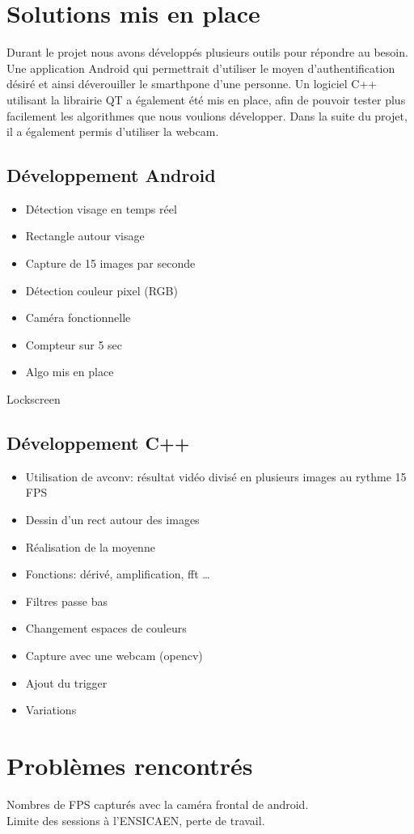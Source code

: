 \section{Solutions mis en place}

Durant le projet nous avons développés plusieurs outils pour répondre au besoin. Une application Android qui permettrait d'utiliser le moyen d'authentification désiré et ainsi déverouiller le smarthpone d'une
personne. Un logiciel C++ utilisant la librairie QT a également été mis en place, afin de pouvoir tester plus facilement les algorithmes que nous voulions développer. Dans la suite du projet, il a également
permis d'utiliser la webcam. 

\subsection{Développement Android}

\begin{itemize}
	\item Détection visage en temps réel
	\item Rectangle autour visage
	\item Capture de 15 images par seconde
	\item Détection couleur pixel (RGB)
	\item Caméra fonctionnelle
	\item Compteur sur 5 sec
	\item Algo mis en place  
\end{itemize}

Lockscreen

\subsection{Développement C++}

\begin{itemize}
 	\item Utilisation de avconv: résultat vidéo divisé en plusieurs images au rythme 15 FPS  
	\item Dessin d'un rect autour des images
	\item Réalisation de la moyenne
	\item Fonctions: dérivé, amplification, fft \ldots{}
	\item Filtres passe bas 
	\item Changement espaces de couleurs
	\item Capture avec une webcam (opencv)
	\item Ajout du trigger 
	\item Variations
\end{itemize}

\section{Problèmes rencontrés}

Nombres de FPS capturés avec la caméra frontal de android.\\
Limite des sessions à l'ENSICAEN, perte de travail.

